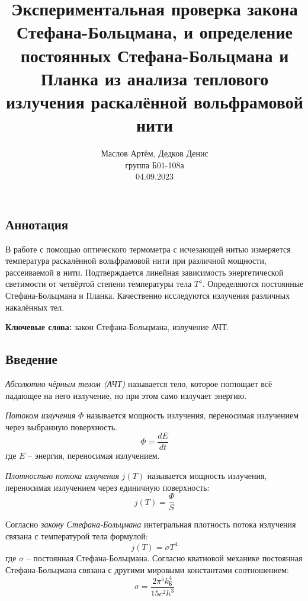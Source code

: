 \documentclass[10pt,a4paper]{article}
\author{\normalsize Маслов Артём, Дедков Денис \\
	\normalsize группа Б01-108а \\
	\normalsize 04.09.2023}
\date{}
\title{
	\Large Экспериментальная проверка закона Стефана-Больцмана, и определение постоянных Стефана-Больцмана и Планка из анализа теплового излучения раскалённой вольфрамовой нити \\ 
}
\begin{document}
\maketitle
\begin{multicols}{2}
	
	\subsection*{Аннотация}
	В работе с помощью оптического термометра с исчезающей нитью измеряется температура раскалённой вольфрамовой нити при различной мощности, рассеиваемой в нити. Подтверждается линейная зависимость энергетической светимости от четвёртой степени температуры тела $T^4$. Определяются постоянные Стефана-Больцмана и Планка. Качественно исследуются излучения различных накалённых тел.
	
	\textbf{Ключевые слова:} закон Стефана-Больцмана, излучение АЧТ.
	
	\subsection*{Введение}
	
	\textit{Абсолютно чёрным телом (АЧТ)} называется тело, которое поглощает всё падающее на него излучение, но при этом само излучает энергию. 
	
	\textit{Потоком излучения} $\Phi$ называется мощность излучения, переносимая излучением через выбранную поверхность.
	$$
	\Phi = \frac{dE}{dt}
	$$
	где $E$ -- энергия, переносимая излучением.
	
	\textit{Плотностью потока излучения} $j(T)$ называется мощность излучения, переносимая излучением через единичную поверхность:
	$$
	j(T) = \frac{\Phi}{S}
	$$
	
	Согласно \textit{закону Стефана-Больцмана} интегральная плотность потока излучения связана с температурой тела формулой:
	\begin{equation}
		j(T) = \sigma T^4
		\label{eq:stefan_boltzman_law}
	\end{equation}
	где $\sigma$ -- постоянная Стефана-Больцмана. Согласно кватновой механике \cite[раздел~VIII]{labnik} постоянная Стефана-Больцмана связана с другими мировыми константами соотношением:
	\begin{equation}
		\sigma = \frac{2 \pi^5 k_Б^4}{15 c^2 h^3}
		\label{eq:const_stefan_boltzmann}
	\end{equation}
	

\end{multicols}
\end{document}
